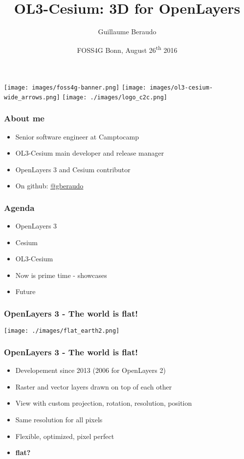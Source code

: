 \documentclass[presentation]{beamer}
\title{OL3-Cesium: 3D for OpenLayers}
\author{Guillaume Beraudo}
\date{FOSS4G Bonn, August 26\textsuperscript{th} 2016}
\begin{document}
  \begin{frame}
    \titlepage
    \begin{center}
      \texttt{[image: images/foss4g-banner.png]}
      \texttt{[image: images/ol3-cesium-wide\_arrows.png]}
      \texttt{[image: ./images/logo\_c2c.png]}
    \end{center}
  \end{frame}


  \begin{frame}
    \frametitle{About me}
    \begin{itemize}
      \item Senior software engineer at Camptocamp
      \item OL3-Cesium main developer and release manager
      \item OpenLayers 3 and Cesium contributor
      \item On github: \href {https://github.com/gberaudo}{@gberaudo}
      \end{itemize}
  \end{frame}


  \begin{frame}
    \frametitle{Agenda}
    \begin{itemize}
      \pause\item OpenLayers 3
      \pause\item Cesium
      \pause\item OL3-Cesium
      \pause\item Now is prime time - showcases
      \pause\item Future
      \end{itemize}
  \end{frame}


  \begin{frame}
    \frametitle{OpenLayers 3 - The world is flat!}
    \begin{center}
     \texttt{[image: ./images/flat\_earth2.png]}
    \end{center}
  \end{frame}


  \begin{frame}
    \frametitle{OpenLayers 3 - The world is flat!}
    \begin{itemize}
      \item Developement since 2013 (2006 for OpenLayers 2)
      \pause\item Raster and vector layers drawn on top of each other
      \pause\item View with custom projection, rotation, resolution, position
      \pause\item Same resolution for all pixels
      \pause\item Flexible, optimized, pixel perfect
      \pause\item \textbf{flat?}
     \end{itemize}
  \end{frame}
\end{document}
